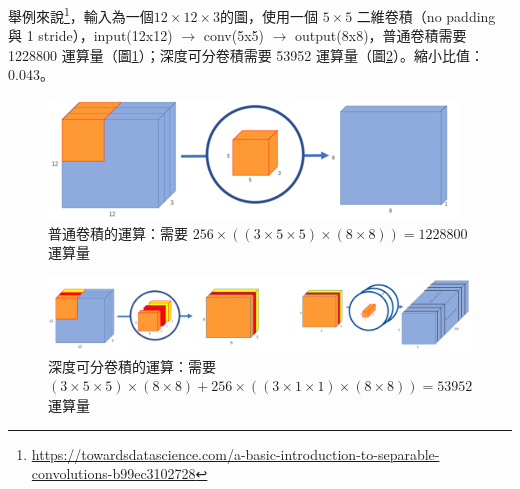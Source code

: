 舉例來說\footnote{\url{https://towardsdatascience.com/a-basic-introduction-to-separable-convolutions-b99ec3102728}
}，輸入為一個$12\times 12\times 3$的圖，使用一個 $5\times5$ 二維卷積（no padding 與 1 stride），input(12x12) $\rightarrow$ conv(5x5) $\rightarrow$ output(8x8)，普通卷積需要 1228800  運算量（圖\ref{depthwise_separable_conv1}）；深度可分卷積需要 53952 運算量（圖\ref{depthwise_separable_conv2}）。縮小比值：0.043。

\begin{figure}[htbp]
    \hfil
    \begin{minipage}[t]{0.60\textwidth}
        \centering
        \includegraphics[width=\textwidth]{./figures/chapter02_method/depthwise_separable_conv1.png}
    \end{minipage}
    \caption {普通卷積的運算：需要 $256\times((3\times5\times5)\times(8\times8))=1228800$ 運算量}
    \label{depthwise_separable_conv1}
    \hfil
\end{figure}

\begin{figure}[htbp]
    \hfil
    \begin{minipage}[t]{1.0\textwidth}
        \centering
        \includegraphics[width=\textwidth]{./figures/chapter02_method/depthwise_separable_conv2.png}
        \caption {深度可分卷積的運算：需要 $(3\times5\times5)\times(8\times8)+256\times((3\times1\times1)\times(8\times8))=53952$ 運算量}
        \label{depthwise_separable_conv2}
    \end{minipage}
    \hfil
\end{figure}


